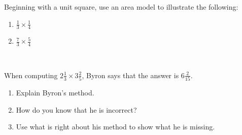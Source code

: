 \vspace{1in}

\begin{prob}
Beginning with a unit square, use an area model to illustrate the following:  
\begin{enumerate}
\item $\frac{1}{3}\times \frac{1}{4}$ 
\item $\frac{7}{3}\times \frac{5}{4}$
\end{enumerate}
\end{prob}

\vspace{1.5in}
\
\begin{prob}
When computing $2\frac{1}{3}\times 3\frac{2}{5}$, Byron says that the answer is $6\frac{2}{15}$.  
\begin{enumerate}
\item Explain Byron's method. 
\item How do you know that he is incorrect?  
\item Use what is right about his method to show what he is missing. 
\end{enumerate}
\end{prob}
